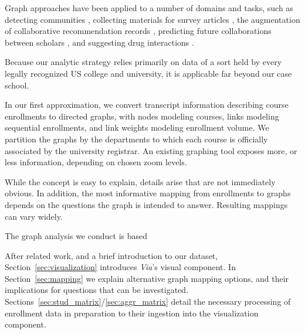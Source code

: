 Graph approaches have been applied to a number of
domains and tasks, such as detecting communities
\cite{Fortunato2004}, collecting materials for survey articles
\cite{ji2015}, the augmentation of collaborative recommendation
records \cite{huang2005}, predicting future collaborations between
scholars \cite{liben2007}, and suggesting drug interactions
\cite{zitnik2018}.

Because our analytic strategy relies primarily on data of a sort held by every legally recognized US college and university, it is applicable far beyond our case school. 


In our first approximation, we convert transcript information describing course enrollments to directed graphs, with nodes modeling courses, links modeling sequential enrollments, and link weights modeling enrollment volume. We partition the graphs by the departments to which each course is officially associated by the university registrar. An existing graphing tool \cite{shannon2003cytoscape} exposes more, or less information, depending on chosen zoom levels.

While the concept is easy to explain, details arise that are not
immediately obvious. In addition, the most informative mapping from
enrollments to graphs depends on the questions the graph is intended
to answer. Resulting mappings can vary widely.

The graph analysis we conduct is based 


After related work, and a brief introduction to our dataset,
Section~\ref{sec:visualization} introduces {\it Via}'s visual
component. In Section~\ref{sec:mapping} we explain alternative graph
mapping options, and their implications for questions that can be
investigated. Sections~\ref{sec:stud_matrix}/\ref{sec:aggr_matrix}
detail the necessary processing of enrollment data in preparation to
their ingestion into the visualization component.


